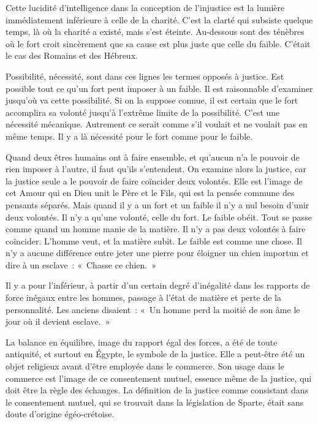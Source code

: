 \documentclass[french,twoside]{book} %
\begin{document}
Cette lucidité d'intelligence dans la conception de l'injustice est la lumière immédiatement inférieure à celle de la charité. C'est la clarté qui subsiste quelque temps, là où la charité a existé, mais s'est éteinte. Au-dessous sont des ténèbres où le fort croit sincèrement que sa cause est plus juste que celle du faible. C'était le cas des Romains et des Hébreux.\par
Possibilité, nécessité, sont dans ces lignes les termes opposés à justice. Est possible tout ce qu'un fort peut imposer à un faible. Il est raisonnable d'examiner jusqu'où va cette possibilité. Si on la suppose connue, il est certain que le fort accomplira sa volonté jusqu'à l'extrême limite de la possibilité. C'est une nécessité mécanique. Autrement ce serait comme s'il voulait et ne voulait pas en même temps. Il y a là nécessité pour le fort comme pour le faible.\par
Quand deux êtres humains ont à faire ensemble, et qu'aucun n'a le pouvoir de rien imposer à l'autre, il faut qu'ils s'entendent. On examine alors la justice, car la justice seule a le pouvoir de faire coïncider deux volontés. Elle est l'image de cet Amour qui en Dieu unit le Père et le Fils, qui est la pensée commune des pensants séparés. Mais quand il y a un fort et un faible il n'y a nul besoin d'unir deux volontés. Il n'y a qu'une volonté, celle du fort. Le faible obéit. Tout se passe comme quand un homme manie de la matière. Il n'y a pas deux volontés à faire coïncider. L'homme veut, et la matière subit. Le faible est comme une chose. Il n'y a aucune différence entre jeter une pierre pour éloigner un chien importun et dire à un esclave : « Chasse ce chien. »\par
Il y a pour l'inférieur, à partir d'un certain degré d'inégalité dans les rapports de force inégaux entre les hommes, passage à l'état de matière et perte de la personnalité. Les anciens disaient : « Un homme perd la moitié de son âme le jour où il devient esclave. »\par
La balance en équilibre, image du rapport égal des forces, a été de toute antiquité, et surtout en Égypte, le symbole de la justice. Elle a peut-être été un objet religieux avant d'être employée dans le commerce. Son usage dans le commerce est l'image de ce consentement mutuel, essence même de la justice, qui doit être la règle des échanges. La définition de la justice comme consistant dans le consentement mutuel, qui se trouvait dans la législation de Sparte, était sans doute d'origine égéo-crétoise.\par
\end{document}
